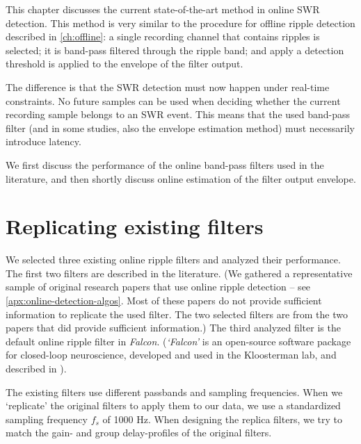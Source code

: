 \label{ch:BPF}

This chapter discusses the current state-of-the-art method in online SWR detection. This method is very similar to the procedure for offline ripple detection described in \cref{ch:offline}: a single recording channel that contains ripples is selected; it is band-pass filtered through the ripple band; and apply a detection threshold is applied to the envelope of the filter output.

The difference is that the SWR detection must now happen under real-time constraints. No future samples can be used when deciding whether the current recording sample belongs to an SWR event. This means that the used band-pass filter (and in some studies, also the envelope estimation method) must necessarily introduce latency.

We first discuss the performance of the online band-pass filters used in the literature, and then shortly discuss online estimation of the filter output envelope.



\section{Replicating existing filters}

We selected three existing online ripple filters and analyzed their performance. The first two filters are described in the literature. (We gathered a representative sample of original research papers that use online ripple detection -- see \cref{apx:online-detection-algos}. Most of these papers do not provide sufficient information to replicate the used filter. The two selected filters are from the two papers that did provide sufficient information.)
The third analyzed filter is the default online ripple filter in \emph{Falcon}. (\emph{`Falcon'} is an open-source software package for closed-loop neuroscience, developed and used in the Kloosterman lab, and described in ).

The existing filters use different passbands and sampling frequencies. When we `replicate' the original filters to apply them to our data, we use a standardized sampling frequency $f_s$ of 1000 Hz. When designing the replica filters, we try to match the gain- and group delay-profiles of the original filters.


